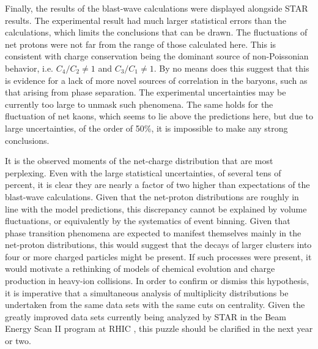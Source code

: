 Finally, the results of the blast-wave calculations were displayed alongside STAR results. The experimental result had much larger statistical errors than the calculations, which limits the conclusions that can be drawn. The fluctuations of net protons were not far from the range of those calculated here. This is consistent with charge conservation being the dominant source of non-Poissonian behavior, i.e. $C_4/C_2\ne 1$ and $C_3/C_1\ne 1$. By no means does this suggest that this is evidence for a lack of more novel sources of correlation in the baryons, such as that arising from phase separation. The experimental uncertainties may be  currently too large to unmask such phenomena. The same holds for the fluctuation of net kaons, which seems to lie above the predictions here, but due to large uncertainties, of the order of 50\%, it is impossible to make any strong conclusions.

It is the observed moments of the net-charge distribution that are most perplexing. Even with the large statistical uncertainties, of several tens of percent, it is clear they are nearly a factor of two higher than expectations of the blast-wave calculations. Given that the net-proton distributions are roughly in line with the model predictions, this discrepancy cannot be explained by volume fluctuations, or equivalently by the systematics of event binning. Given that phase transition phenomena are expected to manifest themselves mainly in the net-proton distributions, this would suggest that the decays of larger clusters into four or more charged particles might be present. If such processes were present, it would motivate a rethinking of models of chemical evolution and charge production in heavy-ion collisions. In order to confirm or dismiss this hypothesis, it is imperative that a simultaneous analysis of multiplicity distributions be undertaken from the same data sets with the same cuts on centrality. Given the greatly improved data sets currently being analyzed by STAR in the Beam Energy Scan II program at RHIC \cite{Yang:2017llt}, this puzzle should be clarified in the next year or two.

